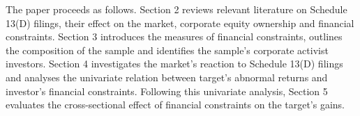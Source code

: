 \documentclass[12pt]{article}
\begin{document}
The paper proceeds as follows. Section 2 reviews relevant literature on Schedule 13(D) filings, their effect on the market, corporate equity ownership and financial constraints. Section 3 introduces the measures of financial constraints, outlines the composition of the sample and identifies the sample's corporate activist investors. Section 4 investigates the market's reaction to Schedule 13(D) filings and analyses the univariate relation between target's abnormal returns and investor's financial constraints. Following this univariate analysis, Section 5 evaluates the cross-sectional effect of financial constraints on the target's gains.


\end{document}
